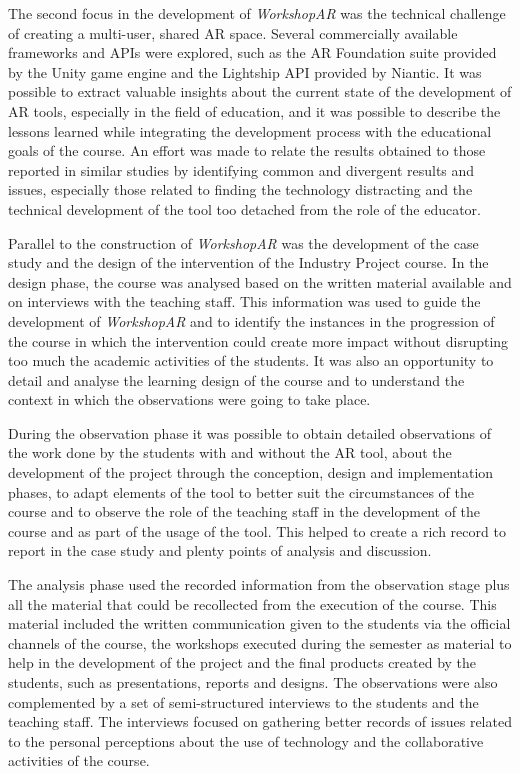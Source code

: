 The second focus in the development of \emph{WorkshopAR} was the technical challenge of creating a multi-user, shared \ac{AR} space. Several commercially available frameworks and APIs were
explored, such as the AR Foundation suite provided by the Unity game engine and the Lightship API provided by Niantic. It was possible to extract valuable insights about the current
state of the development of \ac{AR} tools, especially in the field of education, and it was possible to describe the lessons learned while integrating the development process with the
educational goals of the course. An effort was made to relate the results obtained to those reported in similar studies by identifying common and divergent results and issues, especially
those related to finding the technology distracting and the technical development of the tool too detached from the role of the educator.

Parallel to the construction of \emph{WorkshopAR} was the development of the case study and the design of the intervention of the Industry Project course. In the design phase, the course was
analysed based on the written material available and on interviews with the teaching staff. This information was used to guide the development of \emph{WorkshopAR} and to identify the instances
in the progression of the course in which the intervention could create more impact without disrupting too much the academic activities of the students. It was also an opportunity to
detail and analyse the learning design of the course and to understand the context in which the observations were going to take place.

During the observation phase it was possible to obtain detailed observations of the work done by the students with and without the AR tool, about the development of the project through the
conception, design and implementation phases, to adapt elements of the tool to better suit the circumstances of the course and to observe the role of the teaching staff in the development
of the course and as part of the usage of the tool. This helped to create a rich record to report in the case study and plenty points of analysis and discussion.

The analysis phase used the recorded information from the observation stage plus all the material that could be recollected from the execution of the course. This material included the
written communication given to the students via the official channels of the course, the workshops executed during the semester as material to help in the development of the project and
the final products created by the students, such as presentations, reports and designs. The observations were also complemented by a set of semi-structured interviews to the students and
the teaching staff. The interviews focused on gathering better records of issues related to the personal perceptions about the use of technology and the collaborative activities of the
course.

